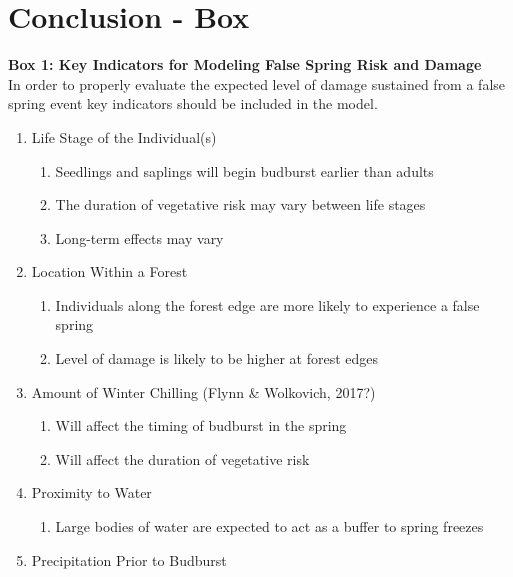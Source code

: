 \documentclass{article}\usepackage[]{graphicx}\usepackage[]{color}
\begin{document}
\section*{Conclusion - Box}
\captionsetup[table]{textformat=empty,labelformat=empty}
\begin{siderules}
\textbf {Box 1: Key Indicators for Modeling False Spring Risk and Damage}\\
In order to properly evaluate the expected level of damage sustained from a false spring event
key indicators should be included in the model.
\renewcommand{\theenumi}{\Roman{enumi}}
\renewcommand{\theenumii}{\roman{enumii}}
\begin{enumerate}
  \item Life Stage of the Individual(s) \citep{Caffarra2011}
  \begin{enumerate}
    \item Seedlings and saplings will begin budburst earlier than adults
    \item The duration of vegetative risk may vary between life stages
    \item Long-term effects may vary
  \end{enumerate}
  \item Location Within a Forest \citep{Augspurger2013}
  \begin{enumerate}
    \item Individuals along the forest edge are more likely to experience a false spring
    \item Level of damage is likely to be higher at forest edges
  \end{enumerate}
  \item Amount of Winter Chilling (Flynn \& Wolkovich, 2017?)
  \begin{enumerate}
    \item Will affect the timing of budburst in the spring
    \item Will affect the duration of vegetative risk
  \end{enumerate}
  \item Proximity to Water %
  \begin{enumerate}
    \item Large bodies of water are expected to act as a buffer to spring freezes
  \end{enumerate}
  \item Precipitation Prior to Budburst \citep{Anderegg2013}
  \begin{enumerate}

\end{enumerate}
\end{enumerate}
\end{siderules}
\end{document}
